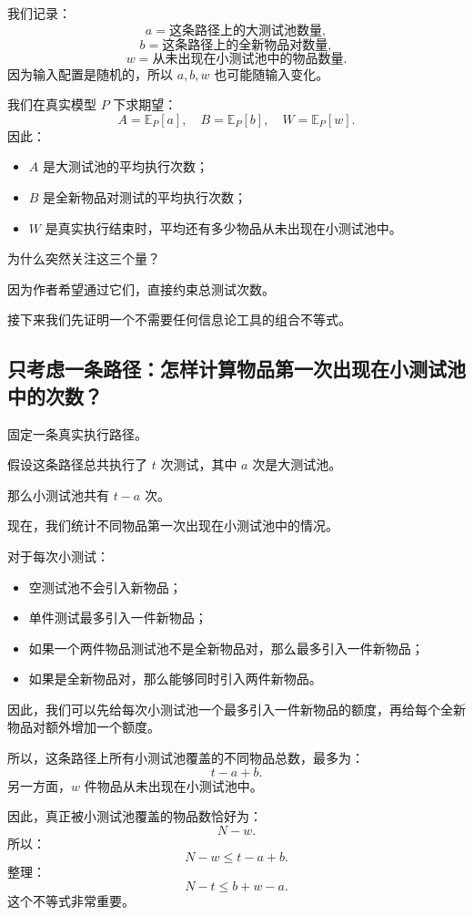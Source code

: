 \documentclass[UTF8,11pt]{ctexart}
\begin{document}
我们记录：
\[a=\text{这条路径上的大测试池数量},\]
\[b=\text{这条路径上的全新物品对数量},\]
\[w=\text{从未出现在小测试池中的物品数量}.\]
因为输入配置是随机的，所以 $a,b,w$ 也可能随输入变化。

我们在真实模型 $P$ 下求期望：
\begin{equation}\boxed{A=\mathbb E_P[a],\quad B=\mathbb E_P[b],\quad W=\mathbb E_P[w].}\tag{16}\end{equation}
因此：
\begin{itemize}
\item $A$ 是大测试池的平均执行次数；
\item $B$ 是全新物品对测试的平均执行次数；
\item $W$ 是真实执行结束时，平均还有多少物品从未出现在小测试池中。
\end{itemize}
为什么突然关注这三个量？

因为作者希望通过它们，直接约束总测试次数。

接下来我们先证明一个不需要任何信息论工具的组合不等式。

\subsection{只考虑一条路径：怎样计算物品第一次出现在小测试池中的次数？}
固定一条真实执行路径。

假设这条路径总共执行了 $t$ 次测试，其中 $a$ 次是大测试池。

那么小测试池共有 $t-a$ 次。

现在，我们统计不同物品第一次出现在小测试池中的情况。

对于每次小测试：
\begin{itemize}
\item 空测试池不会引入新物品；
\item 单件测试最多引入一件新物品；
\item 如果一个两件物品测试池不是全新物品对，那么最多引入一件新物品；
\item 如果是全新物品对，那么能够同时引入两件新物品。
\end{itemize}
因此，我们可以先给每次小测试池一个最多引入一件新物品的额度，再给每个全新物品对额外增加一个额度。

所以，这条路径上所有小测试池覆盖的不同物品总数，最多为：
\[t-a+b.\]
另一方面，$w$ 件物品从未出现在小测试池中。

因此，真正被小测试池覆盖的物品数恰好为：
\[N-w.\]
所以：
\[N-w\le t-a+b.\]
整理：
\begin{equation}\boxed{N-t\le b+w-a.}\tag{17}\end{equation}
这个不等式非常重要。
\end{document}
